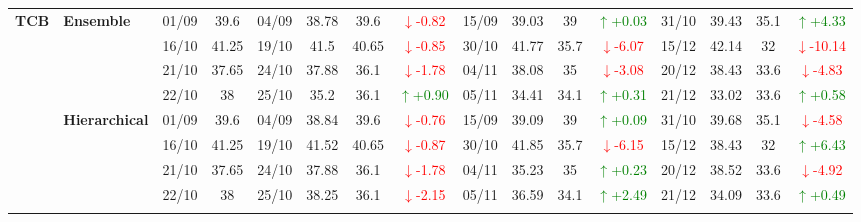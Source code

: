 {\begin{longtable}{llcc|cccc|cccc|cccc}
\multirow{12}{*}{\textbf{TCB}} 
& \textbf{Ensemble}
& 01/09 & 39.6 & 04/09 & 38.78 & 39.6 & \textcolor{red}{\(\downarrow\)-0.82} & 15/09 & 39.03 & 39 & \textcolor{green}{\(\uparrow\)+0.03} & 31/10 & 39.43 & 35.1 & \textcolor{green}{\(\uparrow\)+4.33} \\

&
& 16/10 & 41.25 & 19/10 & 41.5 & 40.65 & \textcolor{red}{\(\downarrow\)-0.85} & 30/10 & 41.77 & 35.7 & \textcolor{red}{\(\downarrow\)-6.07} & 15/12 & 42.14 & 32 & \textcolor{red}{\(\downarrow\)-10.14} \\

&
& 21/10 & 37.65 & 24/10 & 37.88 & 36.1 & \textcolor{red}{\(\downarrow\)-1.78} & 04/11 & 38.08 & 35 & \textcolor{red}{\(\downarrow\)-3.08} & 20/12 & 38.43 & 33.6 & \textcolor{red}{\(\downarrow\)-4.83} \\

&
& 22/10 & 38 & 25/10 & 35.2 & 36.1 & \textcolor{green}{\(\uparrow\)+0.90} & 05/11 & 34.41 & 34.1 & \textcolor{green}{\(\uparrow\)+0.31} & 21/12 & 33.02 & 33.6 & \textcolor{green}{\(\uparrow\)+0.58} \\
\cmidrule(lr){2-16}


& \textbf{Hierarchical}
& 01/09 & 39.6 & 04/09 & 38.84 & 39.6 & \textcolor{red}{\(\downarrow\)-0.76} & 15/09 & 39.09 & 39 & \textcolor{green}{\(\uparrow\)+0.09} & 31/10 & 39.68 & 35.1 & \textcolor{red}{\(\downarrow\)-4.58} \\

&
& 16/10 & 41.25 & 19/10 & 41.52 & 40.65 & \textcolor{red}{\(\downarrow\)-0.87} & 30/10 & 41.85 & 35.7 & \textcolor{red}{\(\downarrow\)-6.15} & 15/12 & 38.43 & 32 & \textcolor{green}{\(\uparrow\)+6.43} \\

&
& 21/10 & 37.65 & 24/10 & 37.88 & 36.1 & \textcolor{red}{\(\downarrow\)-1.78} & 04/11 & 35.23 & 35 & \textcolor{green}{\(\uparrow\)+0.23} & 20/12 & 38.52 & 33.6 & \textcolor{red}{\(\downarrow\)-4.92} \\

&
& 22/10 & 38 & 25/10 & 38.25 & 36.1 & \textcolor{red}{\(\downarrow\)-2.15} & 05/11 & 36.59 & 34.1 & \textcolor{green}{\(\uparrow\)+2.49} & 21/12 & 34.09 & 33.6 & \textcolor{green}{\(\uparrow\)+0.49} \\
\cmidrule(lr){2-16}




\end{longtable}}

